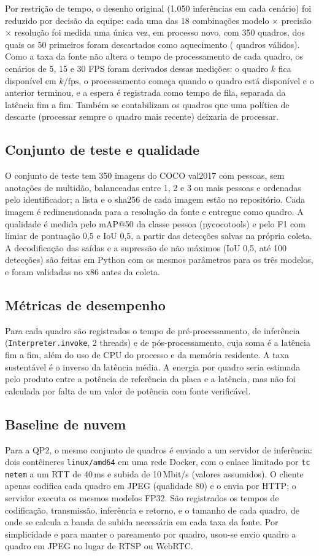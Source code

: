 Por restrição de tempo, o desenho original (1.050 inferências em cada cenário) foi reduzido por decisão
da equipe: cada uma das 18 combinações modelo $\times$ precisão $\times$ resolução foi medida uma única
vez, em processo novo, com 350 quadros, dos quais os 50 primeiros foram descartados como aquecimento
(\nQuadrosValidos{} quadros válidos). Como a taxa da fonte não altera o tempo de processamento de cada
quadro, os cenários de 5, 15 e 30 FPS foram derivados dessas medições: o quadro $k$ fica disponível em
$k/\text{fps}$, o processamento começa quando o quadro está disponível e o anterior terminou, e a espera é
registrada como tempo de fila, separada da latência fim a fim. Também se contabilizam os quadros que uma
política de descarte (processar sempre o quadro mais recente) deixaria de processar.

\subsection{Conjunto de teste e qualidade}
O conjunto de teste tem 350 imagens do COCO val2017 com pessoas, sem anotações de multidão,
balanceadas entre 1, 2 e 3 ou mais pessoas e ordenadas pelo identificador; a lista e o sha256 de cada
imagem estão no repositório. Cada imagem é redimensionada para a resolução da fonte e entregue como
quadro. A qualidade é medida pelo mAP@50 da classe pessoa (pycocotools) e pelo F1 com limiar de
pontuação 0,5 e IoU 0,5, a partir das detecções salvas na própria coleta. A decodificação das saídas
e a supressão de não máximos (IoU 0,5, até 100 detecções) são feitas em Python com os mesmos
parâmetros para os três modelos, e foram validadas no x86 antes da coleta.

\subsection{Métricas de desempenho}
Para cada quadro são registrados o tempo de pré-processamento, de inferência
(\texttt{Interpreter.invoke}, 2 threads) e de pós-processamento, cuja soma é a latência fim a fim, além
do uso de CPU do processo e da memória residente. A taxa sustentável é o inverso da latência média.
A energia por quadro seria estimada pelo produto entre a potência de referência da placa e a latência,
mas não foi calculada por falta de um valor de potência com fonte verificável.

\subsection{Baseline de nuvem}
Para a QP2, o mesmo conjunto de quadros é enviado a um servidor de inferência: dois contêineres
\texttt{linux/amd64} em uma rede Docker, com o enlace limitado por \texttt{tc netem} a um RTT de 40\,ms e
subida de 10\,Mbit/s (valores assumidos). O cliente apenas codifica cada quadro em JPEG (qualidade 80)
e o envia por HTTP; o servidor executa os mesmos modelos FP32. São registrados os tempos de
codificação, transmissão, inferência e retorno, e o tamanho de cada quadro, de onde se calcula a banda
de subida necessária em cada taxa da fonte. Por simplicidade e para manter o pareamento por quadro,
usou-se envio quadro a quadro em JPEG no lugar de RTSP ou WebRTC.

